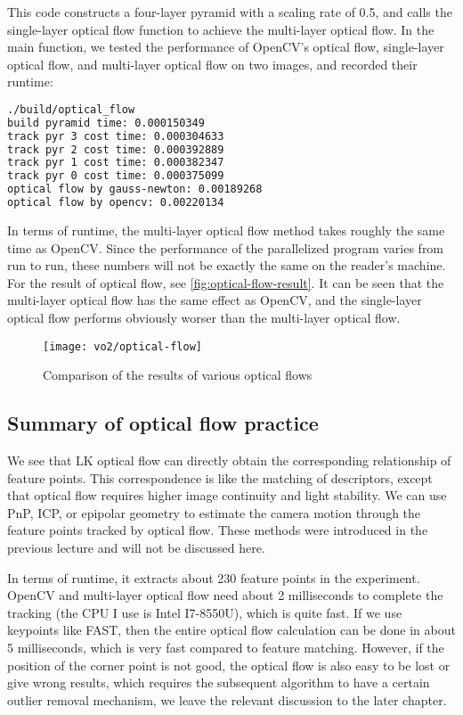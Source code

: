 This code constructs a four-layer pyramid with a scaling rate of 0.5, and calls the single-layer optical flow function to achieve the multi-layer optical flow. In the main function, we tested the performance of OpenCV's optical flow, single-layer optical flow, and multi-layer optical flow on two images, and recorded their runtime:
\begin{lstlisting}[language=sh,caption=终端输入：]
./build/optical_flow
build pyramid time: 0.000150349
track pyr 3 cost time: 0.000304633
track pyr 2 cost time: 0.000392889
track pyr 1 cost time: 0.000382347
track pyr 0 cost time: 0.000375099
optical flow by gauss-newton: 0.00189268
optical flow by opencv: 0.00220134
\end{lstlisting}
In terms of runtime, the multi-layer optical flow method takes roughly the same time as OpenCV. Since the performance of the parallelized program varies from run to run, these numbers will not be exactly the same on the reader's machine. For the result of optical flow, see \autoref{fig:optical-flow-result}. It can be seen that the multi-layer optical flow has the same effect as OpenCV, and the single-layer optical flow performs obviously worser than the multi-layer optical flow.

\begin{figure}[!htp]
	\centering
	\texttt{[image: vo2/optical-flow]}
	\caption{Comparison of the results of various optical flows}
	\label{fig:optical-flow-result}
\end{figure}

\subsection{Summary of optical flow practice}
We see that LK optical flow can directly obtain the corresponding relationship of feature points. This correspondence is like the matching of descriptors, except that optical flow requires higher image continuity and light stability. We can use PnP, ICP, or epipolar geometry to estimate the camera motion through the feature points tracked by optical flow. These methods were introduced in the previous lecture and will not be discussed here.

In terms of runtime, it extracts about 230 feature points in the experiment. OpenCV and multi-layer optical flow need about 2 milliseconds to complete the tracking (the CPU I use is Intel I7-8550U), which is quite fast. If we use keypoints like FAST, then the entire optical flow calculation can be done in about 5 milliseconds, which is very fast compared to feature matching. However, if the position of the corner point is not good, the optical flow is also easy to be lost or give wrong results, which requires the subsequent algorithm to have a certain outlier removal mechanism, we leave the relevant discussion to the later chapter.

